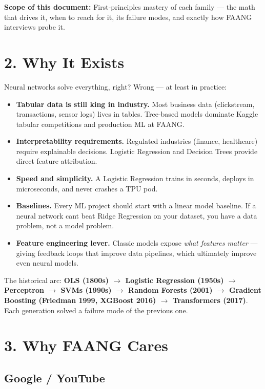 \documentclass[11pt]{article}
\providecommand{\tightlist}{\setlength{\itemsep}{1pt}\setlength{\parskip}{0pt}}
\begin{document}
\textbf{Scope of this document:} First-principles mastery of each family --- the math that drives it, when to reach for it, its failure modes, and exactly how FAANG interviews probe it.

\section{2. Why It Exists}\label{2-why-it-exists}

Neural networks solve everything, right? Wrong --- at least in practice:

\begin{itemize}
\tightlist
\item
  \textbf{Tabular data is still king in industry.} Most business data (clickstream, transactions, sensor logs) lives in tables. Tree-based models dominate Kaggle tabular competitions and production ML at FAANG.
\item
  \textbf{Interpretability requirements.} Regulated industries (finance, healthcare) require explainable decisions. Logistic Regression and Decision Trees provide direct feature attribution.
\item
  \textbf{Speed and simplicity.} A Logistic Regression trains in seconds, deploys in microseconds, and never crashes a TPU pod.
\item
  \textbf{Baselines.} Every ML project should start with a linear model baseline. If a neural network can\textquotesingle t beat Ridge Regression on your dataset, you have a data problem, not a model problem.
\item
  \textbf{Feature engineering lever.} Classic models expose \emph{what features matter} --- giving feedback loops that improve data pipelines, which ultimately improve even neural models.
\end{itemize}

The historical arc: \textbf{OLS (1800s) \(\rightarrow\) Logistic Regression (1950s) \(\rightarrow\) Perceptron \(\rightarrow\) SVMs (1990s) \(\rightarrow\) Random Forests (2001) \(\rightarrow\) Gradient Boosting (Friedman 1999, XGBoost 2016) \(\rightarrow\) Transformers (2017)}. Each generation solved a failure mode of the previous one.

\section{3. Why FAANG Cares}\label{3-why-faang-cares}

\subsection{Google / YouTube}\label{google--youtube}
\end{document}
